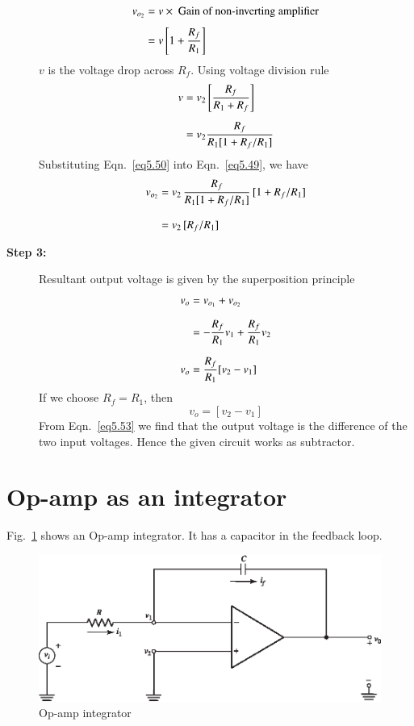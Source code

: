 \begin{description}
\eject

~\phantom{a}

\vskip -1.3cm

\begin{align}
v_{o_{2}} &= v\times \text{~Gain of non-inverting amplifier}\notag\\[4pt]
       &= v\left[1+\frac{R_{f}}{R_{1}}\right]\label{eq5.49}
\end{align}
$v$ is the voltage drop across $R_{f}$. Using voltage division rule
\begin{align}
v &= v_{2}\left[\frac{R_{f}}{R_{1}+R_{f}}\right]\notag\\[5pt]
  &= v_{2}\frac{R_{f}}{R_{1}[1+R_{f}/R_{1}]}\label{eq5.50} 
\end{align}
Substituting Eqn.~\eqref{eq5.50} into Eqn.~\eqref{eq5.49}, we have
\begin{align}
v_{o_{2}} &= v_{2}\,\frac{R_{f}}{R_{1}[1+R_{f}/R_{1}]}\,[1+R_{f}/R_{1}]\notag\\[7pt]
       &= v_{2}\,[R_{f}/R_{1}]\label{eq5.51}
\end{align}

\item[{\bf Step 3:}] Resultant output voltage is given by the superposition principle
\begin{align}
v_{o} &= v_{o_{1}}+v_{o_{2}}\notag\\[7pt]
&= -\frac{R_{f}}{R_{1}}v_{1}+\frac{R_{f}}{R_{1}}v_{2}\notag\\[7pt]
v_{o}&= \frac{R_{f}}{R_{1}}[v_{2}-v_{1}]\label{eq5.52}
\end{align}
If we choose $R_{f}=R_{1}$, then
\begin{equation}
v_{o}=[v_{2}-v_{1}]\label{eq5.53}
\end{equation}
From Eqn.~\eqref{eq5.53} we find that the output voltage is the difference of the two input voltages. Hence the given circuit works as subtractor.
\end{description}

\eject

\section{Op-amp as an integrator}\label{sec5.16}

Fig.~\ref{fig5.19} shows an Op-amp integrator. It has a capacitor in the feedback loop.
\begin{figure}[H]
\centering
\includegraphics{chap4/S3-EE-06-027.eps}
\caption{Op-amp integrator}\label{fig5.19}
\end{figure}

